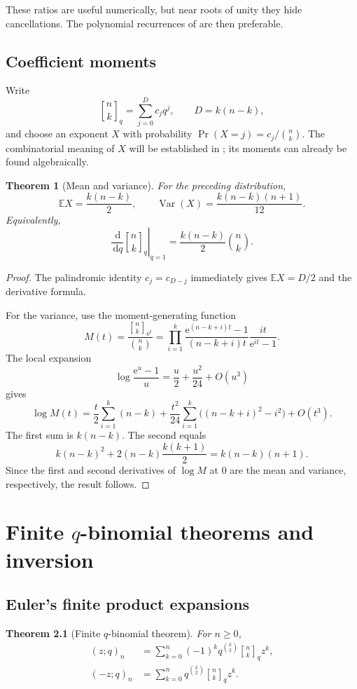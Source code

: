 \documentclass[11pt,oneside,openany]{book}
\newtheorem{theorem}{Theorem}[chapter]
\theoremstyle{definition}
\theoremstyle{remark}
\newcommand{\qbinom}[2]{\genfrac{[}{]}{0pt}{}{#1}{#2}_{q}}
\newcommand{\Qbinom}[3]{\genfrac{[}{]}{0pt}{}{#1}{#2}_{#3}}
\newcommand{\e}{\mathrm e}
\newcommand{\dd}{\,\mathrm d}
\begin{document}
These ratios are useful numerically, but near roots of unity they hide cancellations.  The polynomial recurrences of  are then preferable.

\section{Coefficient moments}

Write
\[
 \qbinom nk=\sum_{j=0}^{D}c_jq^j,
 \qquad D=k(n-k),
\]
and choose an exponent $X$ with probability
\(
 \Pr(X=j)=c_j/\binom nk.
\)
The combinatorial meaning of $X$ will be established in ; its moments can already be found algebraically.

\begin{theorem}[Mean and variance]\label{thm:qbinom-moments}
For the preceding distribution,
\[
 \mathbb E X=\frac{k(n-k)}2,
 \qquad
 \operatorname{Var}(X)=\frac{k(n-k)(n+1)}{12}.
\]
Equivalently,
\[
 \left.\frac{\dd}{\dd q}\qbinom nk\right|_{q=1}
 =\frac{k(n-k)}2\binom nk.
\]
\end{theorem}

\begin{proof}
The palindromic identity $c_j=c_{D-j}$ immediately gives $\mathbb EX=D/2$ and the derivative formula.

For the variance, use the moment-generating function
\[
 M(t)=\frac{\Qbinom nk{\e^t}}{\binom nk}
 =\prod_{i=1}^{k}
 \frac{\e^{(n-k+i)t}-1}{(n-k+i)t}
 \frac{it}{\e^{it}-1}.
\]
The local expansion
\[
 \log\frac{\e^{u}-1}{u}=\frac u2+\frac{u^2}{24}+O(u^3)
\]
gives
\[
 \log M(t)
 =\frac t2\sum_{i=1}^k(n-k)
 +\frac{t^2}{24}\sum_{i=1}^k\bigl((n-k+i)^2-i^2\bigr)+O(t^3).
\]
The first sum is $k(n-k)$.  The second equals
\[
 k(n-k)^2+2(n-k)\frac{k(k+1)}2
 =k(n-k)(n+1).
\]
Since the first and second derivatives of $\log M$ at $0$ are the mean and variance, respectively, the result follows.
\end{proof}

\chapter{Finite \texorpdfstring{$q$}{q}-binomial theorems and inversion}\label{chap:finite-qbinomial}

\section{Euler's finite product expansions}

\begin{theorem}[Finite $q$-binomial theorem]\label{thm:finite-qbinomial}
For $n\ge0$,
\begin{align}
 (z;q)_n
 &=\sum_{k=0}^{n}(-1)^kq^{\binom k2}\qbinom nk z^k,\label{eq:finite-qbinomial-minus}\\
 (-z;q)_n
 &=\sum_{k=0}^{n}q^{\binom k2}\qbinom nk z^k.\label{eq:finite-qbinomial-plus}
\end{align}
\end{theorem}
\end{document}

